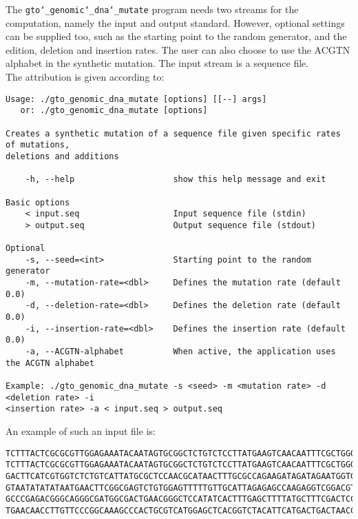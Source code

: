 The \texttt{gto\char`_genomic\char`_dna\char`_mutate} program needs two streams for the computation, namely the input and output standard. However, optional settings can be supplied too, such as the starting point to the random generator, and the edition, deletion and insertion rates. The user can also choose to use the ACGTN alphabet in the synthetic mutation. The input stream is a sequence file.\\
The attribution is given according to:
\begin{lstlisting}
Usage: ./gto_genomic_dna_mutate [options] [[--] args]
   or: ./gto_genomic_dna_mutate [options]

Creates a synthetic mutation of a sequence file given specific rates of mutations, 
deletions and additions

    -h, --help                    show this help message and exit

Basic options
    < input.seq                   Input sequence file (stdin)
    > output.seq                  Output sequence file (stdout)

Optional
    -s, --seed=<int>              Starting point to the random generator
    -m, --mutation-rate=<dbl>     Defines the mutation rate (default 0.0)
    -d, --deletion-rate=<dbl>     Defines the deletion rate (default 0.0)
    -i, --insertion-rate=<dbl>    Defines the insertion rate (default 0.0)
    -a, --ACGTN-alphabet          When active, the application uses the ACGTN alphabet

Example: ./gto_genomic_dna_mutate -s <seed> -m <mutation rate> -d <deletion rate> -i 
<insertion rate> -a < input.seq > output.seq
\end{lstlisting}
An example of such an input file is:
\begin{lstlisting}
TCTTTACTCGCGCGTTGGAGAAATACAATAGTGCGGCTCTGTCTCCTTATGAAGTCAACAATTTCGCTGGGACTTGCGGC
TCTTTACTCGCGCGTTGGAGAAATACAATAGTGCGGCTCTGTCTCCTTATGAAGTCAACAATTTCGCTGGGACTTGCGGC
GACTTCATCGTGGTCTCTGTCATTATGCGCTCCAACGCATAACTTTGCGCCAGAAGATAGATAGAATGGTGTAAGAAACT
GTAATATATATAATGAACTTCGGCGAGTCTGTGGAGTTTTTGTTGCATTAGAGAGCCAAGAGGTCGGACGTCCTCACGTA
GCCCGAGACGGGCAGGGCGATGGCGACTGAACGGGCTCCATATCACTTTGAGCTTTTATGCTTTCGACTCCTCCAGGAGC
TGAACAACCTTGTTCCCGGCAAAGCCCACTGCGTCATGGAGCTCACGGTCTACATTCATGACTGACTAACCGTAAACTGC
\end{lstlisting}

